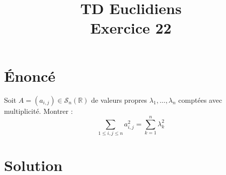 \documentclass[french]{article}
\title{TD Euclidiens\\ Exercice 22}
\date{}
\newcommand{\R}{\mathbb{R}}
\begin{document}
\maketitle

\section{Énoncé}
Soit $A=(a_{i,j})\in\mathcal{S}_n(\R)$ de valeurs propres $\lambda_1,\ldots,\lambda_n$ comptées avec multiplicité. Montrer : $$\sum_{1\leqslant i,j\leqslant n}a_{i,j}^2=\sum_{k=1}^{n}\lambda_k^2$$
\section{Solution}
\end{document}
